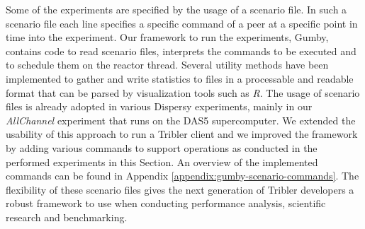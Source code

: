 Some of the experiments are specified by the usage of a scenario file. In such a scenario file each line specifies a specific command of a peer at a specific point in time into the experiment. Our framework to run the experiments, Gumby, contains code to read scenario files, interprets the commands to be executed and to schedule them on the reactor thread. Several utility methods have been implemented to gather and write statistics to files in a processable and readable format that can be parsed by visualization tools such as \emph{R}. The usage of scenario files is already adopted in various Dispersy experiments, mainly in our \emph{AllChannel} experiment that runs on the DAS5 supercomputer. We extended the usability of this approach to run a Tribler client and we improved the framework by adding various commands to support operations as conducted in the performed experiments in this Section. An overview of the implemented commands can be found in Appendix \ref{appendix:gumby-scenario-commands}. The flexibility of these scenario files gives the next generation of Tribler developers a robust framework to use when conducting performance analysis, scientific research and benchmarking.


